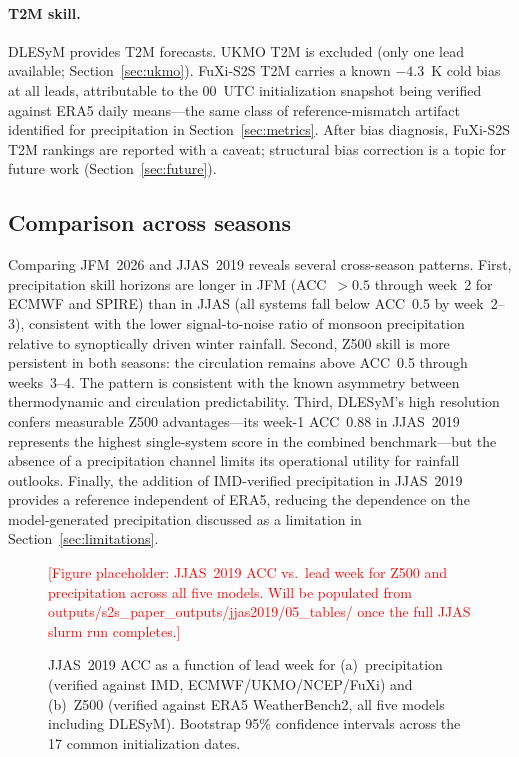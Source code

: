 \documentclass[11pt,a4paper]{article}
\newcommand{\ph}[1]{\textcolor{red}{[#1]}}
\begin{document}
\paragraph{T2M skill.}
DLESyM provides T2M forecasts. UKMO T2M is excluded (only one lead available;
Section~\ref{sec:ukmo}). FuXi-S2S T2M carries a known $-4.3$~K cold bias at
all leads, attributable to the 00~UTC initialization snapshot being verified
against ERA5 daily means---the same class of reference-mismatch artifact
identified for precipitation in Section~\ref{sec:metrics}. After bias diagnosis,
FuXi-S2S T2M rankings are reported with a caveat; structural bias correction
is a topic for future work (Section~\ref{sec:future}).

\subsection{Comparison across seasons}\label{sec:season_compare}

Comparing JFM~2026 and JJAS~2019 reveals several cross-season patterns.
First, precipitation skill horizons are longer in JFM (ACC~${>}0.5$ through
week~2 for ECMWF and SPIRE) than in JJAS (all systems fall below ACC~0.5 by
week~2--3), consistent with the lower signal-to-noise ratio of monsoon
precipitation relative to synoptically driven winter rainfall.
Second, Z500 skill is more persistent in both seasons: the circulation remains
above ACC~0.5 through weeks~3--4. The pattern is consistent with the known
asymmetry between thermodynamic and circulation predictability.
Third, DLESyM's high resolution confers measurable Z500 advantages---its
week-1 ACC~0.88 in JJAS~2019 represents the highest single-system score
in the combined benchmark---but the absence of a precipitation channel
limits its operational utility for rainfall outlooks.
Finally, the addition of IMD-verified precipitation in JJAS~2019 provides a
reference independent of ERA5, reducing the dependence on the model-generated
precipitation discussed as a limitation in Section~\ref{sec:limitations}.

\begin{figure}[htbp]
  \centering
  \ph{Figure placeholder: JJAS~2019 ACC vs.\ lead week for Z500 and
  precipitation across all five models. Will be populated from
  outputs/s2s\_paper\_outputs/jjas2019/05\_tables/ once the full JJAS
  slurm run completes.}
  \caption{JJAS~2019 ACC as a function of lead week for (a)~precipitation
  (verified against IMD, ECMWF/UKMO/NCEP/FuXi) and (b)~Z500 (verified
  against ERA5 WeatherBench2, all five models including DLESyM). Bootstrap
  95\% confidence intervals across the 17 common initialization dates.}
  \label{fig:jjas_acc}
\end{figure}
\end{document}
